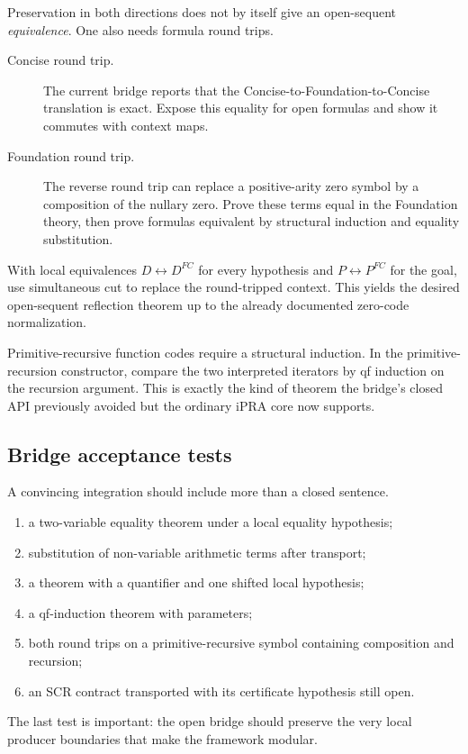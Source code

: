 Preservation in both directions does not by itself give an open-sequent
\emph{equivalence}.  One also needs formula round trips.

\begin{description}
\item[Concise round trip.]  The current bridge reports that the
Concise-to-Foundation-to-Concise translation is exact.  Expose this equality
for open formulas and show it commutes with context maps.
\item[Foundation round trip.]  The reverse round trip can replace a
positive-arity zero symbol by a composition of the nullary zero.  Prove these
terms equal in the Foundation theory, then prove formulas equivalent by
structural induction and equality substitution.
\end{description}

With local equivalences \(D\leftrightarrow D^{FC}\) for every hypothesis and
\(P\leftrightarrow P^{FC}\) for the goal, use simultaneous cut to replace the
round-tripped context.  This yields the desired open-sequent reflection theorem
up to the already documented zero-code normalization.

Primitive-recursive function codes require a structural induction.  In the
primitive-recursion constructor, compare the two interpreted iterators by qf
induction on the recursion argument.  This is exactly the kind of theorem the
bridge's closed API previously avoided but the ordinary iPRA core now supports.

\subsection{Bridge acceptance tests}

A convincing integration should include more than a closed sentence.
\begin{enumerate}[label=(B\arabic*)]
\item a two-variable equality theorem under a local equality hypothesis;
\item substitution of non-variable arithmetic terms after transport;
\item a theorem with a quantifier and one shifted local hypothesis;
\item a qf-induction theorem with parameters;
\item both round trips on a primitive-recursive symbol containing composition
      and recursion;
\item an SCR contract transported with its certificate hypothesis still open.
\end{enumerate}
The last test is important: the open bridge should preserve the very local
producer boundaries that make the framework modular.
